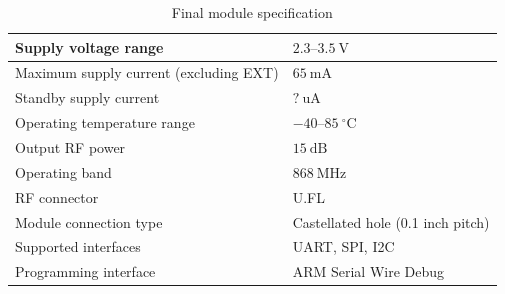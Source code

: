 \begin{table}[H]
\begin{center}
\caption{\label{table:module-specification}Final module specification}
    \begin{tabular}{|l|l|} \hline
    Supply voltage range                    & $2.3\text{--}3.5~\mathrm{V}$\\ \hline
    Maximum supply current (excluding EXT)  & $65~\mathrm{mA}$\\ \hline
    Standby supply current                  & $?~\mathrm{uA}$\\ \hline
    Operating temperature range             & $-40\text{--}85~\mathrm{^\circ C}$\\ \hline
    Output RF power                         & $15~\mathrm{dB}$\\ \hline
    Operating band                          & $868~\mathrm{MHz}$\\ \hline
    RF connector                            & U.FL \\ \hline
    Module connection type                  & Castellated hole (0.1 inch pitch) \\ \hline
    Supported interfaces                    & UART, SPI, I2C \\ \hline
    Programming interface                   & ARM Serial Wire Debug \\ \hline
    \end{tabular}
\end{center}
\end{table}

